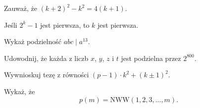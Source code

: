 
\begin{hints_list}
	\item Zauważ, że $(k + 2)^2 - k^2 = 4(k + 1)$. 
	\item Jeśli $2^k - 1$ jest pierwsza, to $k$ jest pierwsza.
	\item Wykaż podzielność $abc \mid a^{13}$.
	\item Udowodnij, że każda z liczb $x$, $y$, $z$ i $t$ jest podzielna przez $2^{800}$.
	\item Wywnioskuj tezę z równości $(p - 1) \cdot k^2 + (k \pm 1)^2$.
	\item Wykaż, że
	\[
		p(m) = \mathrm{NWW}(1, 2, 3, ..., m).
	\]
\end{hints_list}